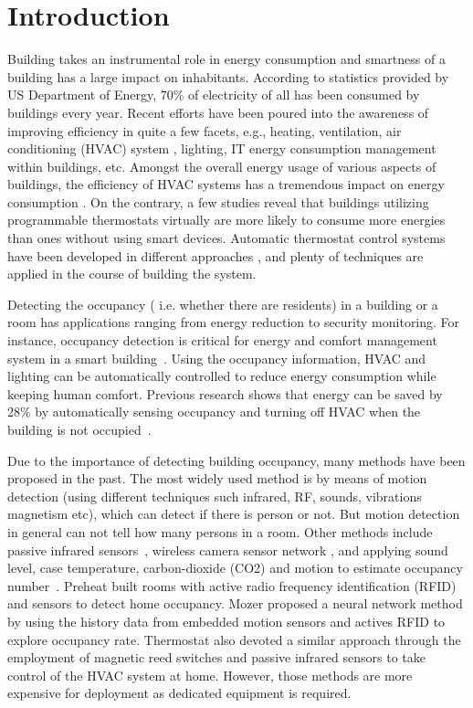 \section{Introduction}
Building takes an instrumental role in energy consumption and smartness of a
building has a large impact on inhabitants. According to statistics provided by
US Department of Energy, 70\% of electricity of all has been consumed by
buildings every year. Recent efforts have been poured into the awareness of
improving efficiency in quite a few facets, e.g., heating, ventilation, air
conditioning (HVAC) system \cite{erickson2009energy}\cite{gao2009selfprog},
lighting\cite{delaney2009eval}, IT energy consumption management within
buildings\cite{agarwal2009augnet}\cite{agarwal2010sleep}, etc. Amongst the
overall energy usage of various aspects of buildings, the efficiency of HVAC
systems has a tremendous impact on energy consumption \cite{hobby2012analysis}.
On the contrary, a few studies \cite{bias1999elec} reveal that buildings
utilizing programmable thermostats virtually are more likely to consume more
energies than ones without using smart devices. Automatic thermostat control
systems have been developed in different approaches
\cite{thomas2012intelligent}\cite{lu2012eval}, and plenty of techniques are
applied in the course of building the system.

Detecting the occupancy ( i.e. whether there are residents) in a
building or a room has applications ranging from energy reduction
to security monitoring. For instance, occupancy detection is critical for energy and comfort
management system in a smart building~\cite{Nguyen2013Energy}.  Using
the occupancy information, HVAC and lighting can be automatically
controlled to reduce energy consumption while keeping human comfort.
Previous research shows that energy can be saved by 28\% by
automatically sensing occupancy and turning off HVAC when the building
is not occupied~\cite{Lu:SenSys10}.

Due to the importance of detecting building occupancy, many methods
have been proposed in the past. The most widely used method is by
means of motion detection (using different techniques such infrared,
RF, sounds, vibrations magnetism etc), which can detect if there is
person or not. But motion detection in general can not tell how many
persons in a room.  Other methods include passive infrared
sensors~\cite{Dodier2006Building}, wireless camera sensor network
\cite{erickson2009energy}, and applying sound level, case temperature,
carbon-dioxide (CO2) and motion to estimate occupancy
number~\cite{Ekwevugbe2013Real}.  Preheat \cite{scott2011ctrl} built rooms with
active radio frequency identification (RFID) and sensors to detect
home occupancy. Mozer \cite{mozer1997neurothermostat} proposed a neural network method by
using the history data from embedded motion sensors and actives RFID
to explore occupancy rate. Thermostat \cite{lu2010smartthermostat} also devoted a
similar approach through the employment of magnetic reed switches and
passive infrared sensors to take control of the HVAC system at
home. However, those methods are more expensive for deployment as
dedicated equipment is required.

